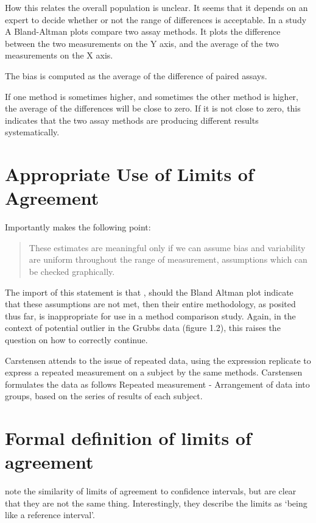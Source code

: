 \documentclass[12pt, a4paper]{report}
\theoremstyle{plain}
\theoremstyle{definition}
\theoremstyle{remark}
\begin{document}
	How this relates the overall population is unclear. It seems that
	it depends on an expert to decide whether or not the range of
	differences is acceptable. In a study A Bland-Altman plots compare
	two assay methods. It plots the difference between the two
	measurements on the Y axis, and the average of the two
	measurements on the X axis.
	
	The bias is computed as the average of the difference of paired
	assays.
	
	If one method is sometimes higher, and sometimes the other method
	is higher, the average of the differences will be close to zero.
	If it is not close to zero, this indicates that the two assay
	methods are producing different results systematically.


	\section{Appropriate Use of Limits of Agreement}
	Importantly \citet{BA99} makes the following point:
	\begin{quote}These estimates are meaningful only if we can assume
		bias and variability are uniform throughout the range of
		measurement, assumptions which can be checked graphically.
	\end{quote}
	
	The import of this statement is that , should the Bland Altman
	plot indicate that these assumptions are not met, then their
	entire methodology, as posited thus far, is inappropriate for use
	in a method comparison study. Again, in the context of potential
	outlier in the Grubbs data (figure 1.2), this raises the question
	on how to correctly continue.
	
	Carstensen attends to the issue of repeated data, using the
	expression replicate to express a repeated measurement on a
	subject by the same methods. Carstensen formulates the data as
	follows Repeated measurement - Arrangement of data into groups,
	based on the series of results of each subject.
	
	
	
	\section{Formal definition of limits of agreement}
	\citet{BA99} note the similarity of limits of agreement to
	confidence intervals, but are clear that they are not the same
	thing. Interestingly, they describe the limits as `being like a
	reference interval'.
	
\end{document}

